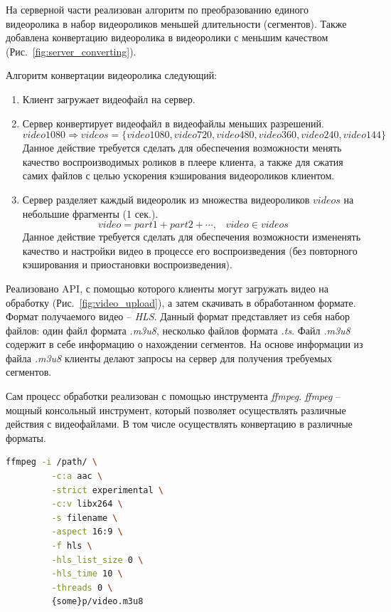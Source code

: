 \documentclass{../includes/TechDoc}
\begin{document}
    На серверной части реализован алгоритм по преобразованию единого видеоролика в набор видеороликов меньшей длительности (сегментов).
    Также добавлена конвертацию видеоролика в видеоролики с меньшим качеством (Рис.~\ref{fig:server_converting}).

    Алгоритм конвертации видеоролика следующий:
    \begin{enumerate}
        \item Клиент загружает видеофайл на сервер.
        \item Сервер конвертирует видеофайл в видеофайлы меньших разрешений.
        \[ video1080 \Rightarrow videos = \{ video1080, video720, video480, video360, video240, video144 \} \]
        Данное действие требуется сделать для обеспечения возможности менять качество воспроизводимых роликов в плеере клиента,
        а также для сжатия самих файлов с целью ускорения кэширования видеороликов клиентом.
        \item Сервер разделяет каждый видеоролик из множества видеороликов \(videos\) на небольшие фрагменты (1 сек.).
        \[ video = part1 + part2 + \cdots, \;\;\; video \in videos \]
        Данное действие требуется сделать для обеспечения возможности измененять качество и настройки видео в процессе его воспроизведения
        (без повторного кэширования и приостановки воспроизведения).
    \end{enumerate}

    Реализовано API, с помощью которого клиенты могут загружать видео на обработку (Рис.~\ref{fig:video_upload}), а затем скачивать в обработанном формате.
    Формат получаемого видео -- \emph{HLS}. Данный формат представляет из себя набор файлов: один файл формата \emph{.m3u8}, несколько файлов формата \emph{.ts}.
    Файл \emph{.m3u8} содержит в себе информацию о нахождении сегментов.
    На основе информации из файла \emph{.m3u8} клиенты делают запросы на сервер для получения требуемых сегментов.

    Сам процесс обработки реализован с помощью инструмента \emph{ffmpeg}.
    \emph{ffmpeg} -- мощный консольный инструмент, который позволяет осуществлять различные действия с видеофайлами.
    В том числе осуществлять конвертацию в различные форматы.

    \begin{lstlisting}[language=bash,caption={Пример команды ffmpeg для генерации файла в формате HLS}]
    ffmpeg -i /path/ \
         -c:a aac \
         -strict experimental \
         -c:v libx264 \
         -s filename \
         -aspect 16:9 \
         -f hls \
         -hls_list_size 0 \
         -hls_time 10 \
         -threads 0 \
         {some}p/video.m3u8
    \end{lstlisting}
\end{document}
